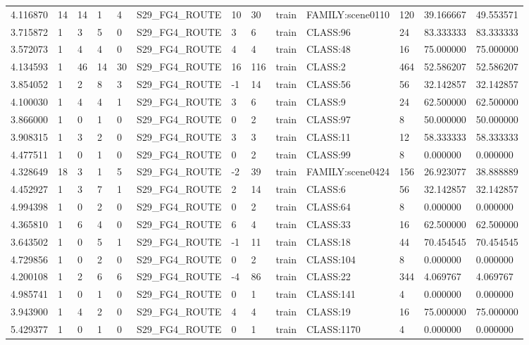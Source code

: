 \begin{tabular}{lllllllllllll}
4.116870 & 14 & 14 & 1 & 4 & S29\_FG4\_ROUTE & 10 & 30 & train & FAMILY:scene0110 & 120 & 39.166667 & 49.553571 \\
3.715872 & 1 & 3 & 5 & 0 & S29\_FG4\_ROUTE & 3 & 6 & train & CLASS:96 & 24 & 83.333333 & 83.333333 \\
3.572073 & 1 & 4 & 4 & 0 & S29\_FG4\_ROUTE & 4 & 4 & train & CLASS:48 & 16 & 75.000000 & 75.000000 \\
4.134593 & 1 & 46 & 14 & 30 & S29\_FG4\_ROUTE & 16 & 116 & train & CLASS:2 & 464 & 52.586207 & 52.586207 \\
3.854052 & 1 & 2 & 8 & 3 & S29\_FG4\_ROUTE & -1 & 14 & train & CLASS:56 & 56 & 32.142857 & 32.142857 \\
4.100030 & 1 & 4 & 4 & 1 & S29\_FG4\_ROUTE & 3 & 6 & train & CLASS:9 & 24 & 62.500000 & 62.500000 \\
3.866000 & 1 & 0 & 1 & 0 & S29\_FG4\_ROUTE & 0 & 2 & train & CLASS:97 & 8 & 50.000000 & 50.000000 \\
3.908315 & 1 & 3 & 2 & 0 & S29\_FG4\_ROUTE & 3 & 3 & train & CLASS:11 & 12 & 58.333333 & 58.333333 \\
4.477511 & 1 & 0 & 1 & 0 & S29\_FG4\_ROUTE & 0 & 2 & train & CLASS:99 & 8 & 0.000000 & 0.000000 \\
4.328649 & 18 & 3 & 1 & 5 & S29\_FG4\_ROUTE & -2 & 39 & train & FAMILY:scene0424 & 156 & 26.923077 & 38.888889 \\
4.452927 & 1 & 3 & 7 & 1 & S29\_FG4\_ROUTE & 2 & 14 & train & CLASS:6 & 56 & 32.142857 & 32.142857 \\
4.994398 & 1 & 0 & 2 & 0 & S29\_FG4\_ROUTE & 0 & 2 & train & CLASS:64 & 8 & 0.000000 & 0.000000 \\
4.365810 & 1 & 6 & 4 & 0 & S29\_FG4\_ROUTE & 6 & 4 & train & CLASS:33 & 16 & 62.500000 & 62.500000 \\
3.643502 & 1 & 0 & 5 & 1 & S29\_FG4\_ROUTE & -1 & 11 & train & CLASS:18 & 44 & 70.454545 & 70.454545 \\
4.729856 & 1 & 0 & 2 & 0 & S29\_FG4\_ROUTE & 0 & 2 & train & CLASS:104 & 8 & 0.000000 & 0.000000 \\
4.200108 & 1 & 2 & 6 & 6 & S29\_FG4\_ROUTE & -4 & 86 & train & CLASS:22 & 344 & 4.069767 & 4.069767 \\
4.985741 & 1 & 0 & 1 & 0 & S29\_FG4\_ROUTE & 0 & 1 & train & CLASS:141 & 4 & 0.000000 & 0.000000 \\
3.943900 & 1 & 4 & 2 & 0 & S29\_FG4\_ROUTE & 4 & 4 & train & CLASS:19 & 16 & 75.000000 & 75.000000 \\
5.429377 & 1 & 0 & 1 & 0 & S29\_FG4\_ROUTE & 0 & 1 & train & CLASS:1170 & 4 & 0.000000 & 0.000000 \\

\end{tabular}
